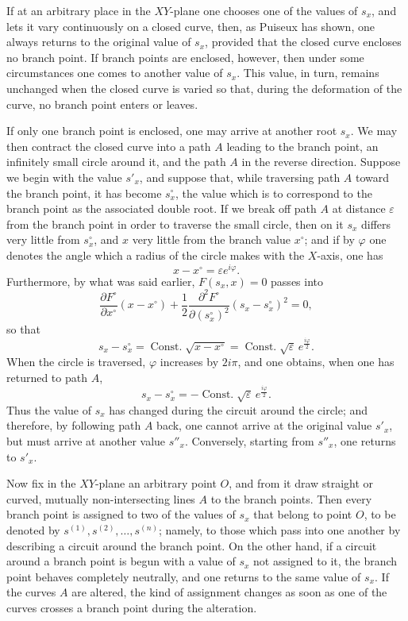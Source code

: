 \documentclass[10pt]{article}
\begin{document}
If at an arbitrary place in the \(XY\)-plane one chooses one of the values of \(s_x\), and lets it vary continuously on a closed curve, then, as Puiseux has shown, one always returns to the original value of \(s_x\), provided that the closed curve encloses no branch point. If branch points are enclosed, however, then under some circumstances one comes to another value of \(s_x\). This value, in turn, remains unchanged when the closed curve is varied so that, during the deformation of the curve, no branch point enters or leaves.

If only one branch point is enclosed, one may arrive at another root \(s_x\). We may then contract the closed curve into a path \(A\) leading to the branch point, an infinitely small circle around it, and the path \(A\) in the reverse direction. Suppose we begin with the value \(s'_x\), and suppose that, while traversing path \(A\) toward the branch point, it has become \(s_x^\circ\), the value which is to correspond to the branch point as the associated double root. If we break off path \(A\) at distance \(\varepsilon\) from the branch point in order to traverse the small circle, then on it \(s_x\) differs very little from \(s_x^\circ\), and \(x\) very little from the branch value \(x^\circ\); and if by \(\varphi\) one denotes the angle which a radius of the circle makes with the \(X\)-axis, one has
\[
x-x^\circ=\varepsilon e^{i\varphi}.
\]
Furthermore, by what was said earlier, \(F(s_x,x)=0\) passes into
\[
\frac{\partial F^\circ}{\partial x^\circ}(x-x^\circ)
+\frac{1}{2}\frac{\partial^2F^\circ}{\partial (s_x^\circ)^2}(s_x-s_x^\circ)^2=0,
\]
so that
\[
s_x-s_x^\circ=\operatorname{Const.}\sqrt{x-x^\circ}
=\operatorname{Const.}\sqrt\varepsilon\, e^{\frac{i\varphi}{2}}.
\]
When the circle is traversed, \(\varphi\) increases by \(2i\pi\), and one obtains, when one has returned to path \(A\),
\[
s_x-s_x^\circ=-\operatorname{Const.}\sqrt\varepsilon\, e^{\frac{i\varphi}{2}}.
\]
Thus the value of \(s_x\) has changed during the circuit around the circle; and therefore, by following path \(A\) back, one cannot arrive at the original value \(s'_x\), but must arrive at another value \(s''_x\). Conversely, starting from \(s''_x\), one returns to \(s'_x\).

Now fix in the \(XY\)-plane an arbitrary point \(O\), and from it draw straight or curved, mutually non-intersecting lines \(A\) to the branch points. Then every branch point is assigned to two of the values of \(s_x\) that belong to point \(O\), to be denoted by \(s^{(1)},s^{(2)},\ldots,s^{(n)}\); namely, to those which pass into one another by describing a circuit around the branch point. On the other hand, if a circuit around a branch point is begun with a value of \(s_x\) not assigned to it, the branch point behaves completely neutrally, and one returns to the same value of \(s_x\). If the curves \(A\) are altered, the kind of assignment changes as soon as one of the curves crosses a branch point during the alteration.
\end{document}
